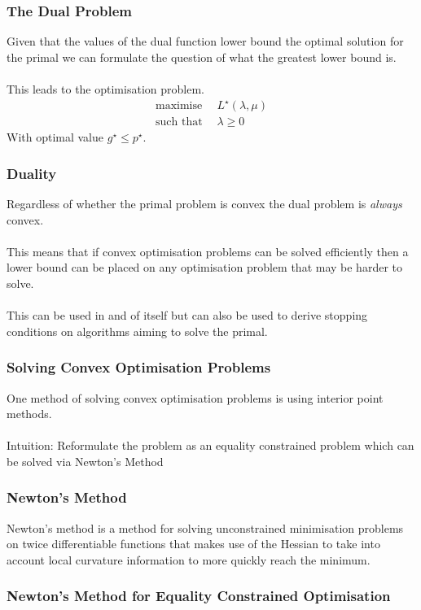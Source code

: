 \documentclass{beamer}
\begin{document}
\begin{frame}
    \frametitle{The Dual Problem}
    Given that the values of the dual function lower bound the optimal solution
    for the primal we can formulate the question of what the greatest lower
    bound is.
    \\~\\
    This leads to the optimisation problem.
    {\footnotesize
    \begin{align*}
        \text{maximise } \, &L^{\star}(\lambda, \mu)\\
        \text{such that } &\lambda \geq 0
    \end{align*}}
    With optimal value $g^{\star} \leq p^{\star}$. \end{frame}

\begin{frame}
    \frametitle{Duality}
    Regardless of whether the primal problem is convex the dual problem is
    \textit{always} convex.
    \\~\\
    This means that if convex optimisation problems can be solved efficiently
    then a lower bound can be placed on any optimisation problem that may be
    harder to solve.
    \\~\\
    This can be used in and of itself but can also be used to derive stopping
    conditions on algorithms aiming to solve the primal.
\end{frame}

\begin{frame}
    \frametitle{Solving Convex Optimisation Problems}
    One method of solving convex optimisation problems is using interior point
    methods.
    \\~\\
    Intuition: Reformulate the problem as an equality constrained problem which
    can be solved via Newton's Method
\end{frame}

\begin{frame}
    \frametitle{Newton's Method}
    Newton's method is a method for solving unconstrained minimisation problems
    on twice differentiable functions that makes use of the Hessian to take into
    account local curvature information to more quickly reach the minimum.
\end{frame}

\begin{frame}
    \frametitle{Newton's Method for Equality Constrained Optimisation}
\end{frame}
\end{document}
